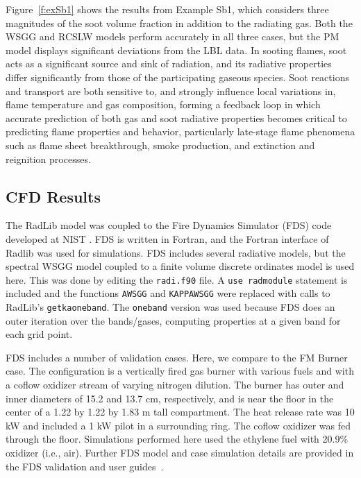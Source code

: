 \documentclass[preprint,12pt]{elsarticle}
\begin{document}
Figure~\ref{f:exSb1} shows the results from Example Sb1, which considers three magnitudes of the soot volume fraction in addition to the radiating gas. Both the WSGG and RCSLW models perform accurately in all three cases, but the PM model displays significant deviations from the LBL data. In sooting flames, soot acts as a significant source and sink of radiation, and its radiative properties differ significantly from those of the participating gaseous species. Soot reactions and transport are both sensitive to, and strongly influence local variations in, flame temperature and gas composition, forming a feedback loop in which accurate prediction of both gas and soot radiative properties becomes critical to predicting flame properties and behavior, particularly late-stage flame phenomena such as flame sheet breakthrough, smoke production, and extinction and reignition processes.




\subsection{CFD Results} \label{s:cfd}

The RadLib model was coupled to the Fire Dynamics Simulator (FDS) code developed at NIST \cite{FDS}. FDS is written in Fortran, and the Fortran interface of Radlib was used for simulations. FDS includes several radiative models, but the spectral WSGG model coupled to a finite volume discrete ordinates model is used here. This was done by editing the \texttt{radi.f90} file. A \texttt{use rad\textunderscore module} statement is included and the functions \texttt{A\textunderscore WSGG} and \texttt{KAPPA\textunderscore WSGG} were replaced with calls to RadLib's \texttt{get\textunderscore k\textunderscore a\textunderscore oneband}. The \texttt{oneband} version was used because FDS does an outer iteration over the bands/gases, computing properties at a given band for each grid point. 

FDS includes a number of validation cases. Here, we compare to the FM Burner case. The configuration is a vertically fired gas burner with various fuels and with a coflow oxidizer stream of varying nitrogen dilution. The burner has outer and inner diameters of 15.2 and 13.7 cm, respectively, and is near the floor in the center of a 1.22 by 1.22 by 1.83 m tall compartment. The heat release rate was 10 kW and included a 1 kW pilot in a surrounding ring. The coflow oxidizer was fed through the floor. Simulations performed here used the ethylene fuel with 20.9\%  oxidizer (i.e., air). Further FDS model and case simulation details are provided in the FDS validation and user guides~\cite{FDS}.
\end{document}
